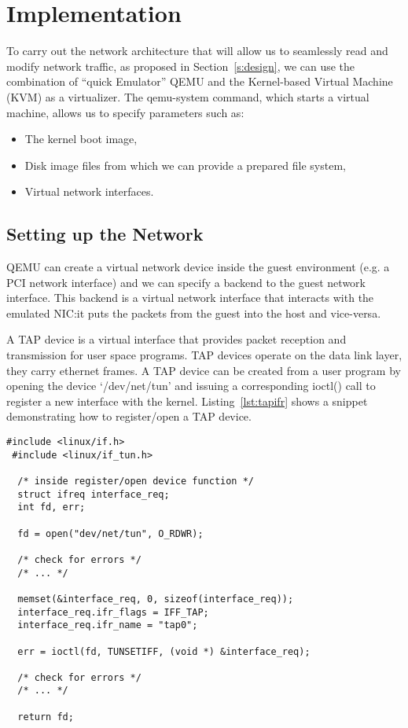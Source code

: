 \section{Implementation}\label{s:implementation} %

To carry out the network architecture that will allow us to seamlessly read and modify
network traffic, as proposed in Section~\ref{s:design}, we can use the combination of
``quick Emulator'' QEMU and the Kernel-based Virtual Machine (KVM) as a virtualizer. The qemu-system command, which
starts a virtual machine, allows us to specify parameters such as:
\begin{itemize}
  \item The kernel boot image,
  \item Disk image files from which we can provide a prepared file system, %
  \item Virtual network interfaces.
\end{itemize}

\subsection{Setting up the Network}

QEMU can create a virtual network device
inside the guest environment (e.g. a PCI network interface) and we can specify a backend to the
guest network interface. This backend is a virtual network interface that interacts with the
emulated NIC:\@ it puts the packets from the guest into the host and vice-versa\cite{DocumentationNetworkingQEMU}.

A TAP device is a virtual interface that provides packet reception and transmission for user space programs.
TAP devices operate on the data link layer, they carry ethernet frames.
A TAP device can be created from a user program by opening the device `/dev/net/tun'  and issuing a
corresponding ioctl() call to register a new interface with the kernel\cite{krasnyanskyUniversalTUNTAP}.
Listing~\ref{lst:tapifr} shows a snippet demonstrating how to register/open a TAP device.

\begin{lstlisting}[caption={Registering/opening a virtual TAP interface}, label={lst:tapifr},  style=CStylespecial]
 #include <linux/if.h>
 #include <linux/if_tun.h>

  /* inside register/open device function */
  struct ifreq interface_req;
  int fd, err;

  fd = open("dev/net/tun", O_RDWR);

  /* check for errors */
  /* ... */

  memset(&interface_req, 0, sizeof(interface_req));
  interface_req.ifr_flags = IFF_TAP;
  interface_req.ifr_name = "tap0";

  err = ioctl(fd, TUNSETIFF, (void *) &interface_req);

  /* check for errors */
  /* ... */

  return fd;
\end{lstlisting}

